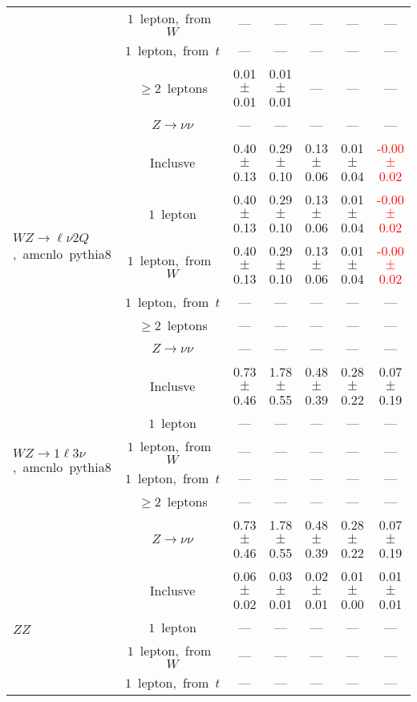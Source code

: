 \documentclass{article}
\begin{document}
\begin{longtable}{|l|c|c|c|c|c|c|}
 & $1$~lepton,~from~$W$  & ---  & ---  & ---  & ---  & --- \\* 
 & $1$~lepton,~from~$t$  & ---  & ---  & ---  & ---  & --- \\* 
 & $\ge2$~leptons  & 0.01 $\pm$ 0.01  & 0.01 $\pm$ 0.01  & ---  & ---  & --- \\* 
 & $Z\rightarrow\nu\nu$  & ---  & ---  & ---  & ---  & --- \\* 
\hline 
\multirow{6}{*}{$WZ{\rightarrow}{\ell}{\nu}2Q$,~amcnlo~pythia8} & Inclusve  & 0.40 $\pm$ 0.13  & 0.29 $\pm$ 0.10  & 0.13 $\pm$ 0.06  & 0.01 $\pm$ 0.04  & \textcolor{red}{ -0.00 $\pm$ 0.02 } \\* 
 & $1$~lepton  & 0.40 $\pm$ 0.13  & 0.29 $\pm$ 0.10  & 0.13 $\pm$ 0.06  & 0.01 $\pm$ 0.04  & \textcolor{red}{ -0.00 $\pm$ 0.02 } \\* 
 & $1$~lepton,~from~$W$  & 0.40 $\pm$ 0.13  & 0.29 $\pm$ 0.10  & 0.13 $\pm$ 0.06  & 0.01 $\pm$ 0.04  & \textcolor{red}{ -0.00 $\pm$ 0.02 } \\* 
 & $1$~lepton,~from~$t$  & ---  & ---  & ---  & ---  & --- \\* 
 & $\ge2$~leptons  & ---  & ---  & ---  & ---  & --- \\* 
 & $Z\rightarrow\nu\nu$  & ---  & ---  & ---  & ---  & --- \\* 
\hline 
\multirow{6}{*}{$WZ{\rightarrow}1{\ell}3{\nu}$,~amcnlo~pythia8} & Inclusve  & 0.73 $\pm$ 0.46  & 1.78 $\pm$ 0.55  & 0.48 $\pm$ 0.39  & 0.28 $\pm$ 0.22  & 0.07 $\pm$ 0.19 \\* 
 & $1$~lepton  & ---  & ---  & ---  & ---  & --- \\* 
 & $1$~lepton,~from~$W$  & ---  & ---  & ---  & ---  & --- \\* 
 & $1$~lepton,~from~$t$  & ---  & ---  & ---  & ---  & --- \\* 
 & $\ge2$~leptons  & ---  & ---  & ---  & ---  & --- \\* 
 & $Z\rightarrow\nu\nu$  & 0.73 $\pm$ 0.46  & 1.78 $\pm$ 0.55  & 0.48 $\pm$ 0.39  & 0.28 $\pm$ 0.22  & 0.07 $\pm$ 0.19 \\* 
\hline 
\multirow{6}{*}{$ZZ$} & Inclusve  & 0.06 $\pm$ 0.02  & 0.03 $\pm$ 0.01  & 0.02 $\pm$ 0.01  & 0.01 $\pm$ 0.00  & 0.01 $\pm$ 0.01 \\* 
 & $1$~lepton  & ---  & ---  & ---  & ---  & --- \\* 
 & $1$~lepton,~from~$W$  & ---  & ---  & ---  & ---  & --- \\* 
 & $1$~lepton,~from~$t$  & ---  & ---  & ---  & ---  & --- \\* 

\end{longtable}
\end{document}
